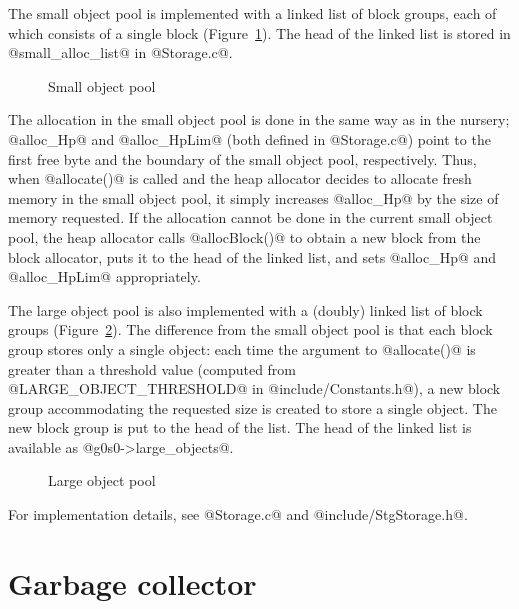 \documentclass{article}
\begin{document}
The small object pool is implemented with a linked list of block groups, 
each of which consists of a single block (Figure~\ref{fig-smallobjectpool}).
The head of the linked list is stored in @small_alloc_list@ in @Storage.c@.

\begin{figure}[ht]
\begin{center}

\caption{Small object pool}
\label{fig-smallobjectpool}
\end{center}
\end{figure}

The allocation in the small object pool is done in the same way as in the
nursery; @alloc_Hp@ and @alloc_HpLim@ (both defined in @Storage.c@) 
point to the first free byte and the boundary of the small object pool, 
respectively.
Thus, when @allocate()@ is called and the heap allocator decides to 
allocate fresh memory in the small object pool, it simply increases @alloc_Hp@
by the size of memory requested. 
If the allocation cannot be done in the current small object pool, the 
heap allocator calls @allocBlock()@ to obtain a new block from the block
allocator, puts it to the head of the linked list, and 
sets @alloc_Hp@ and @alloc_HpLim@ appropriately.

The large object pool is also implemented with a (doubly) linked list of block
groups (Figure~\ref{fig-largeobjectpool}). 
The difference from the small object pool is that each block group stores only 
a single object: each time the argument to @allocate()@ is
greater than a threshold value (computed from @LARGE_OBJECT_THRESHOLD@ 
in @include/Constants.h@), a new block group accommodating the requested size 
is created to store a single object. 
The new block group is put to the head of the list. 
The head of the linked list is available as @g0s0->large_objects@.

\begin{figure}[ht]
\begin{center}

\caption{Large object pool}
\label{fig-largeobjectpool}
\end{center}
\end{figure}

For implementation details, see @Storage.c@ and @include/StgStorage.h@.

\section{Garbage collector}
\end{document}
